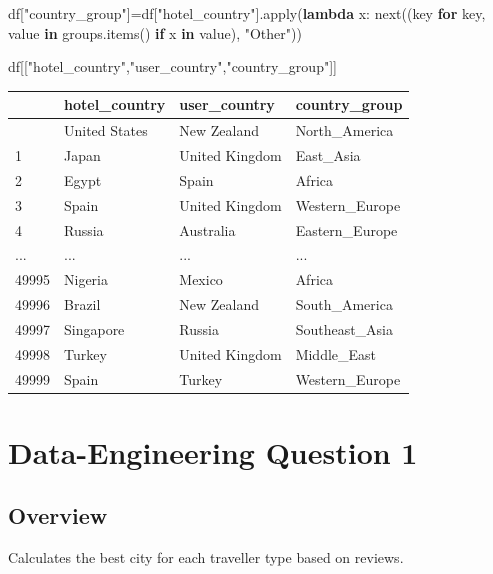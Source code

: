 \documentclass[
  letterpaper,
  DIV=11,
  numbers=noendperiod]{scrartcl}
\newenvironment{Shaded}{\begin{snugshade}}{\end{snugshade}}
\newcommand{\BuiltInTok}[1]{\textcolor[rgb]{0.00,0.23,0.31}{#1}}
\newcommand{\ControlFlowTok}[1]{\textcolor[rgb]{0.00,0.23,0.31}{\textbf{#1}}}
\newcommand{\KeywordTok}[1]{\textcolor[rgb]{0.00,0.23,0.31}{\textbf{#1}}}
\newcommand{\NormalTok}[1]{\textcolor[rgb]{0.00,0.23,0.31}{#1}}
\newcommand{\OperatorTok}[1]{\textcolor[rgb]{0.37,0.37,0.37}{#1}}
\newcommand{\StringTok}[1]{\textcolor[rgb]{0.13,0.47,0.30}{#1}}
\begin{document}
\begin{Shaded}
\begin{Highlighting}[]
\NormalTok{df[}\StringTok{"country\_group"}\NormalTok{]}\OperatorTok{=}\NormalTok{df[}\StringTok{"hotel\_country"}\NormalTok{].}\BuiltInTok{apply}\NormalTok{(}\KeywordTok{lambda}\NormalTok{ x: }\BuiltInTok{next}\NormalTok{((key }\ControlFlowTok{for}\NormalTok{ key, value }\KeywordTok{in}\NormalTok{ groups.items() }\ControlFlowTok{if}\NormalTok{ x }\KeywordTok{in}\NormalTok{ value), }\StringTok{"Other"}\NormalTok{))}

\NormalTok{df[[}\StringTok{"hotel\_country"}\NormalTok{,}\StringTok{"user\_country"}\NormalTok{,}\StringTok{"country\_group"}\NormalTok{]]}
\end{Highlighting}
\end{Shaded}

\begin{longtable}[]{@{}llll@{}}
\toprule\noalign{}
& hotel\_country & user\_country & country\_group \\
\midrule\noalign{}
\endhead
\bottomrule\noalign{}
\endlastfoot
0 & United States & New Zealand & North\_America \\
1 & Japan & United Kingdom & East\_Asia \\
2 & Egypt & Spain & Africa \\
3 & Spain & United Kingdom & Western\_Europe \\
4 & Russia & Australia & Eastern\_Europe \\
... & ... & ... & ... \\
49995 & Nigeria & Mexico & Africa \\
49996 & Brazil & New Zealand & South\_America \\
49997 & Singapore & Russia & Southeast\_Asia \\
49998 & Turkey & United Kingdom & Middle\_East \\
49999 & Spain & Turkey & Western\_Europe \\
\end{longtable}

\section{Data-Engineering Question 1}\label{data-engineering-question-1}

\subsection{Overview}\label{overview-4}

Calculates the best city for each traveller type based on reviews.
\end{document}
